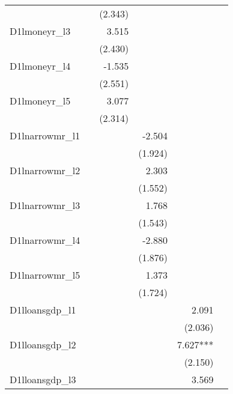 \begin{tabular}{lrrrrr}
                  &           &   (2.343) &           &           &           \\ 
D1lmoneyr\_l3     &           &     3.515 &           &           &           \\ 
                  &           &   (2.430) &           &           &           \\ 
D1lmoneyr\_l4     &           &    -1.535 &           &           &           \\ 
                  &           &   (2.551) &           &           &           \\ 
D1lmoneyr\_l5     &           &     3.077 &           &           &           \\ 
                  &           &   (2.314) &           &           &           \\ 
D1lnarrowmr\_l1   &           &           &    -2.504 &           &           \\ 
                  &           &           &   (1.924) &           &           \\ 
D1lnarrowmr\_l2   &           &           &     2.303 &           &           \\ 
                  &           &           &   (1.552) &           &           \\ 
D1lnarrowmr\_l3   &           &           &     1.768 &           &           \\ 
                  &           &           &   (1.543) &           &           \\ 
D1lnarrowmr\_l4   &           &           &    -2.880 &           &           \\ 
                  &           &           &   (1.876) &           &           \\ 
D1lnarrowmr\_l5   &           &           &     1.373 &           &           \\ 
                  &           &           &   (1.724) &           &           \\ 
D1lloansgdp\_l1   &           &           &           &     2.091 &           \\ 
                  &           &           &           &   (2.036) &           \\ 
D1lloansgdp\_l2   &           &           &           &  7.627*** &           \\ 
                  &           &           &           &   (2.150) &           \\ 
D1lloansgdp\_l3   &           &           &           &     3.569 &           \\ 

\end{tabular}
